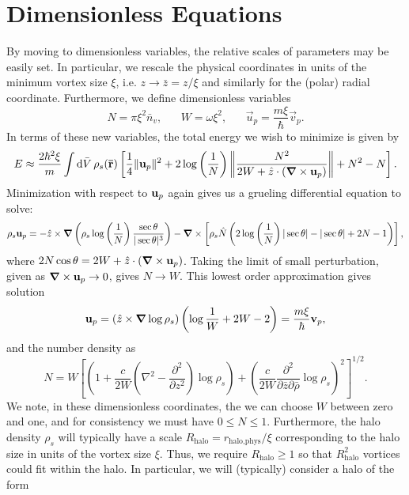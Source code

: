 \documentclass[onecolumn,nofootinbib,superscriptaddress]{revtex4}
\newcommand{\dd}[1]{\mathrm{d}#1\,}
\begin{document}
\section{Dimensionless Equations}

By moving to dimensionless variables, the relative scales of parameters may be easily set.  In particular, we rescale the physical coordinates in units of the minimum vortex size $\xi$, i.e. $z\rightarrow \bar{z} = z/\xi$ and similarly for the (polar) radial coordinate.  Furthermore, we define dimensionless variables
\begin{equation}
N = \pi\xi^2 \bar{n}_v, \;\;\;\;\;\; W = \omega \xi^2, \;\;\;\;\;\; \vec{u}_p = \frac{m\xi}{\hbar}\vec{v}_p. \nonumber
\end{equation}
In terms of these new variables, the total energy we wish to minimize is given by
\begin{equation}
E \approx \frac{2\hbar^2\xi}{m}\int\dd{\bar{V}}\rho_s({\bf{\bar{r}}})\left[\frac{1}{4}\|{\bf u}_p\|^2 + 2\log\left(\frac{1}{N}\right)\left\|\frac{N^2}{2W + \hat{z}\cdot({\boldsymbol \nabla}\times{\bf u}_p)}\right\| + N^2 - N\right].
\end{equation}
Minimization with respect to ${\bf u}_p$ again gives us a grueling differential equation to solve:
\begin{equation}
\rho_s {\bf u}_p = -\hat{z}\times {\boldsymbol \nabla}\left(\rho_s\log\left(\frac{1}{N}\right)\frac{\sec\theta}{|\sec\theta|^3}\right) - {\boldsymbol \nabla}\times\left[\rho_s\hat{N}\left(2\log\left(\frac{1}{N}\right)|\sec\theta|-|\sec\theta|+2N-1\right)\right],
\end{equation}
where $2N\cos\theta = 2W+\hat{z}\cdot({\boldsymbol \nabla}\times{\bf u}_p)$.  Taking the limit of small perturbation, given as ${\boldsymbol \nabla}\times {\bf u}_p\rightarrow 0$, gives $N\rightarrow W$.  This lowest order approximation gives solution
\begin{equation}
{\bf u}_p = \left(\hat{z}\times{\boldsymbol \nabla}\log \rho_s\right)\left(\log\frac{1}{W} + 2W - 2\right) = \frac{m\xi}{\hbar}{\bf v}_p,
\end{equation}
and the number density as
\begin{equation}
N = W\left[\left(1+\frac{c}{2W}\left(\nabla^2-\frac{\partial^2}{\partial z^2}\right)\log \rho_s\right) + \left(\frac{c}{2W}\frac{\partial^2}{\partial\bar{z}\partial\bar{\rho}}\log \rho_s\right)^2\right]^{1/2}.
\end{equation}
We note, in these dimensionless coordinates, the we can choose $W$ between zero and one, and for consistency we must have $0\leq N\leq 1$.  Furthermore, the halo density $\rho_s$ will typically have a scale $R_\text{halo}  = r_\text{halo,phys}/\xi$ corresponding to the halo size in units of the vortex size $\xi$.  Thus, we require $R_\text{halo} \geq 1$ so that $R_\text{halo}^2$ vortices could fit within the halo.  In particular, we will (typically) consider a halo of the form
\end{document}
